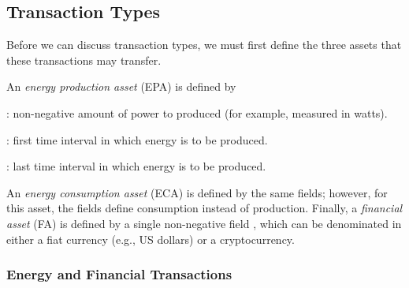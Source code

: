 \subsection{Transaction Types}

Before we can discuss transaction types, we must first define the three assets that these transactions may transfer.

An \emph{energy production asset} (EPA) is defined by
\begin{compactitem}
\item {}: non-negative amount of power to produced (for example, measured in watts).
\item {}: first time interval in which energy is to be produced. 
\item {}: last time interval in which energy is to be produced.
\end{compactitem}
An \emph{energy consumption asset} (ECA) is defined by the same fields; however, for this asset, the fields define consumption instead of production.
Finally, a \emph{financial asset} (FA) is defined by a single non-negative field , which can be denominated in either a fiat currency (e.g., US dollars) or a cryptocurrency.

\subsubsection{Energy and Financial Transactions}


